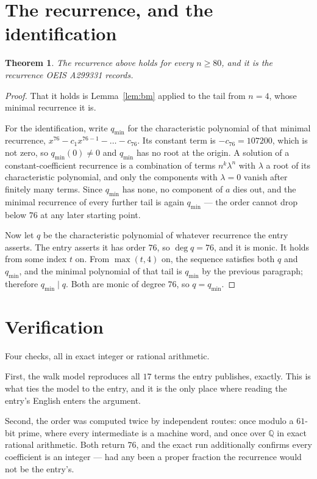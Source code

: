 \documentclass[11pt,a4paper]{article}
\theoremstyle{plain}
\newtheorem{theorem}{Theorem}
\theoremstyle{definition}
\begin{document}
\section{The recurrence, and the identification}

\begin{theorem}
The recurrence above holds for every $n\ge80$, and it is the recurrence OEIS A299331 records.
\end{theorem}

\begin{proof}
That it holds is Lemma~\ref{lem:bm} applied to the tail from $n=4$, whose minimal
recurrence it is.

For the identification, write $q_{\min}$ for the characteristic polynomial of that minimal
recurrence, $x^{76}-c_1x^{76-1}-\dots-c_{76}$. Its constant term is
$-c_{76}=107200$, which is not zero, so $q_{\min}(0)\neq0$ and $q_{\min}$ has no
root at the origin. A solution of a constant-coefficient recurrence is a combination of terms
$n^{k}\lambda^{n}$ with $\lambda$ a root of its characteristic polynomial, and only the
components with $\lambda=0$ vanish after finitely many terms. Since $q_{\min}$ has none, no
component of $a$ dies out, and the minimal recurrence of every further tail is again
$q_{\min}$ --- the order cannot drop below $76$ at any later starting point.

Now let $q$ be the characteristic polynomial of whatever recurrence the entry asserts. The
entry asserts it has order $76$, so $\deg q=76$, and it is monic. It holds from some
index $t$ on. From $\max(t,4)$ on, the sequence satisfies both $q$ and $q_{\min}$, and
the minimal polynomial of that tail is $q_{\min}$ by the previous paragraph; therefore
$q_{\min}\mid q$. Both are monic of degree $76$, so $q=q_{\min}$.
\end{proof}

\section{Verification}

Four checks, all in exact integer or rational arithmetic.

First, the walk model reproduces all $17$ terms the entry publishes, exactly. This is
what ties the model to the entry, and it is the only place where reading the entry's English
enters the argument.

Second, the order was computed twice by independent routes: once modulo a $61$-bit prime, where
every intermediate is a machine word, and once over $\mathbb{Q}$ in exact rational arithmetic.
Both return $76$, and the exact run additionally confirms every coefficient is an integer
--- had any been a proper fraction the recurrence would not be the entry's.
\end{document}
